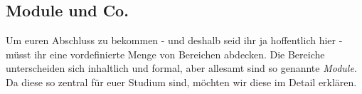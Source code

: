 \subsection{Module und Co.}
Um euren Abschluss zu bekommen - und deshalb seid ihr ja hoffentlich hier - müsst ihr eine vordefinierte Menge von Bereichen abdecken. Die Bereiche unterscheiden sich inhaltlich und formal, aber allesamt sind so genannte \textit{Module}. Da diese so zentral für euer Studium sind, möchten wir diese im Detail erklären.

%
%

